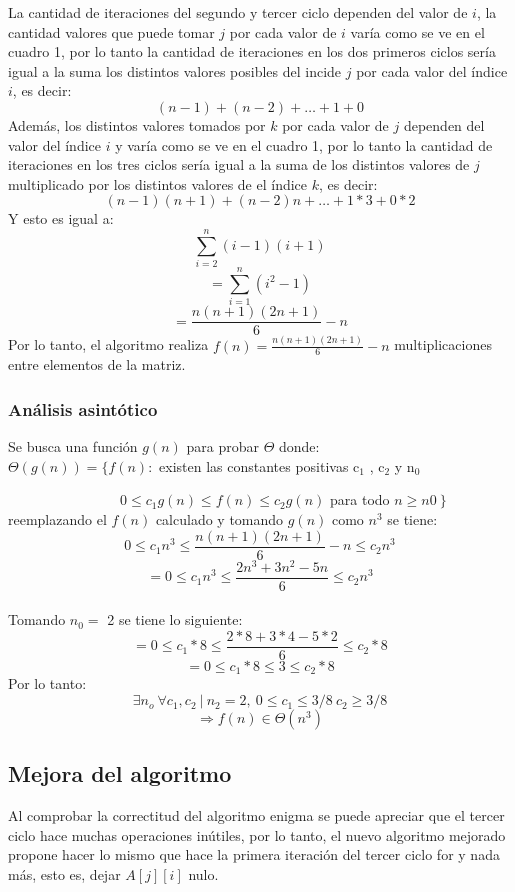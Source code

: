 \documentclass[11pt]{article}
\begin{document}
La cantidad de iteraciones del segundo y tercer ciclo dependen del valor de \(i\), la cantidad valores que puede tomar \(j\) por cada valor de \(i\) varía como se ve en el cuadro 1, por lo tanto la cantidad de iteraciones en los dos primeros ciclos sería igual a la suma los distintos valores posibles del incide \(j\) por cada valor del índice \(i\), es decir: \[(n-1)+(n-2)+ \dots +1+0\]
Además, los distintos valores tomados por \(k\) por cada valor de \(j\) dependen del valor del índice \(i\) y varía como se ve en el cuadro 1, por lo tanto la cantidad de iteraciones en los tres ciclos sería igual a la suma de los distintos valores de \(j\) multiplicado por los distintos valores de el índice \(k\), es decir: \[(n-1)(n+1)+(n-2)n+ \dots +1*3+0*2\]
Y esto es igual a:
\[\sum_{i=2}^{n}  (i-1)(i+1)\]
\[= \sum_{i=1}^{n}  (i^2-1)\]
\[= \frac{n(n+1)(2n+1)}{6} - n\]
Por lo tanto, el algoritmo realiza \(f(n) = \frac{n(n+1)(2n+1)}{6} - n \) multiplicaciones entre elementos de la matriz.
\subsubsection{Análisis asintótico}
Se busca una función \(g(n)\) para probar $\Theta$ donde:\\

\( \Theta (g(n))  =  \{ f (n) :\) existen las constantes positivas c$_1$ , c$_2$ y n$_0$ 

\ \ \ \ \ \ \ \ \ \ \ \ \ \ \ \ \(0\leq  c_1 g (n) \leq f (n) \leq c_2 g (n)\) para todo \( n \geq n0 \ \}  \)\\

reemplazando el \(f(n)\) calculado y tomando \(g(n)\) como \(n^3\) se tiene:
\[0 \leq  c_1 n^3 \leq \frac{n(n+1)(2n+1)}{6} - n \leq c_2 n^3\]
\[= 0 \leq  c_1 n^3 \leq \frac{2n^3+3n^2-5n}{6} \leq c_2 n^3\]\\

Tomando \(n_0 = \) 2 se tiene lo siguiente:
\[= 0 \leq  c_1 * 8 \leq \frac{2*8+3*4-5*2}{6} \leq c_2 * 8\]
\[= 0 \leq  c_1 * 8 \leq 3 \leq c_2 * 8\]
Por lo tanto:
\[ \exists n_o\  \forall c_1,c_2 \ | \ n_2 = 2,\ 0 \leq c_1 \leq 3/8 \ c_2 \geq 3/8 \]
\[\Rightarrow f(n) \in \Theta(n^3)\]

\subsection{Mejora del algoritmo}
Al comprobar la correctitud del algoritmo enigma se puede apreciar que el tercer ciclo hace muchas operaciones inútiles, por lo tanto, el nuevo algoritmo mejorado propone hacer lo mismo que hace la primera iteración del tercer ciclo for y nada más, esto es, dejar \(A[j][i]\) nulo.
\end{document}
